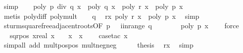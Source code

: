 \begin{isabellebody}
\ simp\isanewline
\ \ \isamarkupfalse%
\ {\isachardoublequoteopen}poly\ {\isacharparenleft}{\isacharquery}p\ div\ {\isacharquery}q{\isacharparenright}\ x\ {\isacharasterisk}\ poly\ {\isacharquery}q\ x\ {\isacharminus}\ poly\ {\isacharquery}r\ x\ {\isacharequal}\ poly\ {\isacharquery}p\ x{\isachardoublequoteclose}\ \isanewline
\ \ \ \ \ \ \isamarkupfalse%
\ {\isacharparenleft}metis\ poly{\isacharunderscore}diff\ poly{\isacharunderscore}mult{\isacharparenright}\isanewline
\ \ \isamarkupfalse%
\ q{\isacharunderscore}{}\ \isamarkupfalse%
\ r{\isacharunderscore}x{\isacharcolon}\ {\isachardoublequoteopen}poly\ {\isacharquery}r\ x\ {\isacharequal}\ {\isacharminus}poly\ {\isacharquery}p\ x{\isachardoublequoteclose}\ \isamarkupfalse%
\ simp\isanewline
\isanewline
\ \ \isamarkupfalse%
\ sturm{\isacharunderscore}squarefree{\isacharprime}{\isacharunderscore}adjacent{\isacharunderscore}roots{\isacharbrackleft}OF\ {\isacharbackquoteopen}p\ {\isasymnoteq}\ {}{\isacharbackquoteclose}{\isacharbrackright}\ i{\isacharunderscore}in{\isacharunderscore}range\ q{\isacharunderscore}{}\isanewline
\ \ \ \ \ \ \isamarkupfalse%
\ {\isachardoublequoteopen}poly\ {\isacharquery}p\ x\ {\isasymnoteq}\ {}{\isachardoublequoteclose}\ \isamarkupfalse%
\ force\isanewline
\ \ \isamarkupfalse%
\ \isamarkupfalse%
\ sqr{\isacharunderscore}pos{\isacharcolon}\ {\isachardoublequoteopen}{\isasymAnd}x{\isacharcolon}{\isacharcolon}real{\isachardot}\ x\ {\isasymnoteq}\ {}\ {\isasymLongrightarrow}\ x\ {\isacharasterisk}\ x\ {\isachargreater}\ {}{\isachardoublequoteclose}\ \isamarkupfalse%
\ {\isacharparenleft}case{\isacharunderscore}tac\ {\isachardoublequoteopen}x\ {\isasymge}\ {}{\isachardoublequoteclose}{\isacharparenright}\isanewline
\ \ \ \ \ \ \isamarkupfalse%
\ {\isacharparenleft}simp{\isacharunderscore}all\ add{\isacharcolon}\ mult{\isacharunderscore}pos{\isacharunderscore}pos\ mult{\isacharunderscore}neg{\isacharunderscore}neg{\isacharparenright}\isanewline
\ \ \isamarkupfalse%
\ \isamarkupfalse%
\ {\isacharquery}thesis\ \isamarkupfalse%
\ r{\isacharunderscore}x\ \isamarkupfalse%
\ simp\isanewline
{}\isamarkupfalse%
%
\endisatagproof
{\isafoldproof}%
%
\isadelimproof
%
\endisadelimproof
%
\begin{isamarkuptext}%

\end{isamarkuptext}
\end{isabellebody}

